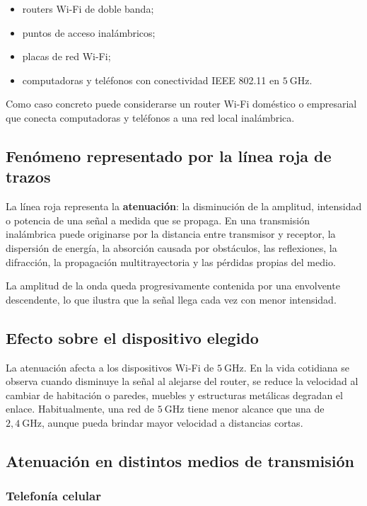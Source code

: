 \documentclass[12pt,a4paper]{article}
\begin{document}
\begin{itemize}
  \item routers Wi-Fi de doble banda;
  \item puntos de acceso inalámbricos;
  \item placas de red Wi-Fi;
  \item computadoras y teléfonos con conectividad IEEE 802.11 en $5\ \mathrm{GHz}$.
\end{itemize}

Como caso concreto puede considerarse un router Wi-Fi doméstico o empresarial
que conecta computadoras y teléfonos a una red local inalámbrica.

\subsection{Fenómeno representado por la línea roja de trazos}

La línea roja representa la \textbf{atenuación}: la disminución de la amplitud,
intensidad o potencia de una señal a medida que se propaga. En una transmisión
inalámbrica puede originarse por la distancia entre transmisor y receptor, la
dispersión de energía, la absorción causada por obstáculos, las reflexiones, la
difracción, la propagación multitrayectoria y las pérdidas propias del medio.

La amplitud de la onda queda progresivamente contenida por una envolvente
descendente, lo que ilustra que la señal llega cada vez con menor intensidad.

\subsection{Efecto sobre el dispositivo elegido}

La atenuación afecta a los dispositivos Wi-Fi de $5\ \mathrm{GHz}$. En la vida
cotidiana se observa cuando disminuye la señal al alejarse del router, se reduce
la velocidad al cambiar de habitación o paredes, muebles y estructuras
metálicas degradan el enlace. Habitualmente, una red de $5\ \mathrm{GHz}$ tiene
menor alcance que una de $2{,}4\ \mathrm{GHz}$, aunque pueda brindar mayor
velocidad a distancias cortas.

\subsection{Atenuación en distintos medios de transmisión}

\subsubsection{Telefonía celular}
\end{document}
